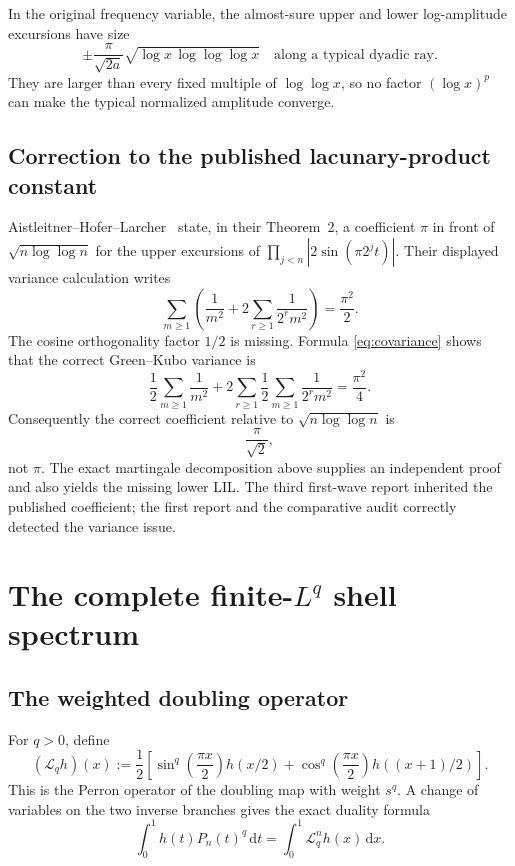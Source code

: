 \documentclass[11pt,oneside]{article}
\theoremstyle{definition}
\theoremstyle{remark}
\newcommand{\dd}{\,\mathrm d}
\newcommand{\Lop}{\mathcal L}
\begin{document}
In the original frequency variable, the almost-sure upper and lower
log-amplitude excursions have size
\begin{equation}
 \pm\frac{\pi}{\sqrt{2a}}
 \sqrt{\log x\,\log\log\log x}
 \quad\text{along a typical dyadic ray}.
 \label{eq:LIL-x}
\end{equation}
They are larger than every fixed multiple of $\log\log x$, so no factor
$(\log x)^p$ can make the typical normalized amplitude converge.

\subsection{Correction to the published lacunary-product constant}
\label{subsec:AHL-correction}

Aistleitner--Hofer--Larcher~\cite{ahl2017} state, in their Theorem~2, a
coefficient $\pi$ in front of $\sqrt{n\log\log n}$ for the upper excursions of
$\prod_{j<n}|2\sin(\pi2^jt)|$.  Their displayed variance calculation writes
\[
 \sum_{m\ge1}\left(\frac1{m^2}
 +2\sum_{r\ge1}\frac1{2^rm^2}\right)=\frac{\pi^2}{2}.
\]
The cosine orthogonality factor $1/2$ is missing.  Formula
\eqref{eq:covariance} shows that the correct Green--Kubo variance is
\begin{equation}
 \frac12\sum_{m\ge1}\frac1{m^2}
 +2\sum_{r\ge1}\frac12\sum_{m\ge1}\frac1{2^rm^2}
 =\frac{\pi^2}{4}.
 \label{eq:AHL-corrected-variance}
\end{equation}
Consequently the correct coefficient relative to
$\sqrt{n\log\log n}$ is
\begin{equation}
 \boxed{\frac{\pi}{\sqrt2}},
 \label{eq:AHL-corrected-constant}
\end{equation}
not $\pi$.  The exact martingale decomposition above supplies an independent
proof and also yields the missing lower LIL.  The third first-wave report
inherited the published coefficient; the first report and the comparative
audit correctly detected the variance issue.

\section{The complete finite-\texorpdfstring{$L^q$}{Lq} shell spectrum}
\label{sec:Lq}

\subsection{The weighted doubling operator}

For $q>0$, define
\begin{equation}
 (\Lop_qh)(x):=\frac12\left[
 \sin^q\!\left(\frac{\pi x}{2}\right)h(x/2)
 +\cos^q\!\left(\frac{\pi x}{2}\right)h((x+1)/2)
 \right].
 \label{eq:Lq-operator}
\end{equation}
This is the Perron operator of the doubling map with weight $s^q$.  A change
of variables on the two inverse branches gives the exact duality formula
\begin{equation}
 \int_0^1 h(t)P_n(t)^q\dd t
 =\int_0^1\Lop_q^nh(x)\dd x.
 \label{eq:Lq-duality}
\end{equation}
\end{document}
